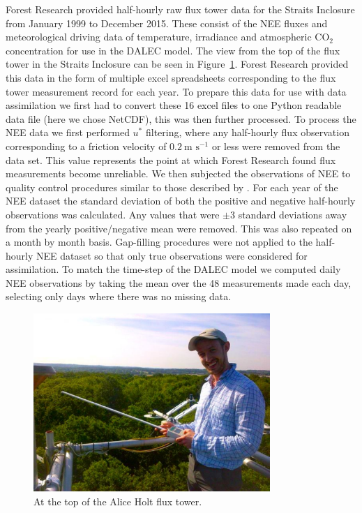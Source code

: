 Forest Research provided half-hourly raw flux tower data for the Straits Inclosure from January 1999 to December 2015. These consist of the NEE fluxes and meteorological driving data of temperature, irradiance and atmospheric CO\(_{2}\) concentration for use in the DALEC model. The view from the top of the flux tower in the Straits Inclosure can be seen in Figure~\ref{chap4:fig:flux_me}. Forest Research provided this data in the form of multiple excel spreadsheets corresponding to the flux tower measurement record for each year. To prepare this data for use with data assimilation we first had to convert these 16 excel files to one Python readable data file (here we chose NetCDF), this was then further processed. To process the NEE data we first performed \(u^*\) filtering, where any half-hourly flux observation corresponding to a friction velocity of \(0.2~\text{m s}^{-1}\) or less were removed from the data set. This value represents the point at which Forest Research found flux measurements become unreliable. We then subjected the observations of NEE to quality control procedures similar to those described by \citet{papale2006towards}. For each year of the NEE dataset the standard deviation of both the positive and negative half-hourly observations was calculated. Any values that were \(\pm 3\) standard deviations away from the yearly positive/negative mean were removed. This was also repeated on a month by month basis. Gap-filling procedures were not applied to the half-hourly NEE dataset so that only true observations were considered for assimilation. To match the time-step of the DALEC model we computed daily NEE observations by taking the mean over the 48 measurements made each day, selecting only days where there was no missing data.  
 

\begin{figure}[ht]
    \centering
    \includegraphics[width=0.8\textwidth]{chapter/chapter4/top_of_flux.pdf}
    \caption{At the top of the Alice Holt flux tower.} \label{chap4:fig:flux_me}
\end{figure}

